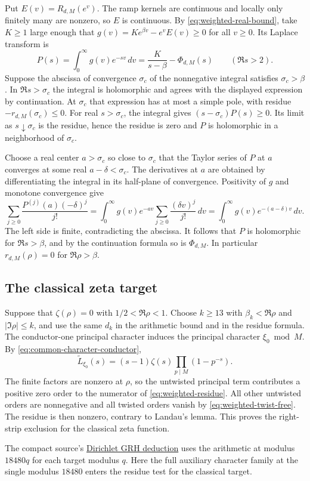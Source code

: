 Put \(E(v)=R_{d,M}(e^v)\). The ramp kernels are continuous and locally only
finitely many are nonzero, so \(E\) is continuous. By
\eqref{eq:weighted-real-bound}, take
\(K\ge1\) large enough that \(g(v)=K e^{\beta v}-e^v E(v)\ge0\) for
all \(v\ge0\). Its Laplace transform is
\[
 P(s)=\int_0^\infty g(v)e^{-sv}\,dv
     =\frac{K}{s-\beta}-\Phi_{d,M}(s) \qquad (\Re s>2).
\]
Suppose the abscissa of convergence \(\sigma_c\) of the nonnegative
integral satisfies \(\sigma_c>\beta\). In \(\Re s>\sigma_c\) the integral
is holomorphic and agrees with the displayed expression by continuation.
At \(\sigma_c\) that expression has at most a simple pole, with residue
\(-r_{d,M}(\sigma_c)\le0\). For real \(s>\sigma_c\), the integral gives
\((s-\sigma_c)P(s)\ge0\). Its limit as \(s\downarrow\sigma_c\) is the
residue, hence the residue is zero and \(P\) is holomorphic in a
neighborhood of \(\sigma_c\).

Choose a real center \(a>\sigma_c\) so close to \(\sigma_c\) that the
Taylor series of \(P\) at \(a\) converges at some real \(a-\delta<\sigma_c\).
The derivatives at \(a\) are obtained by differentiating the integral in
its half-plane of convergence. Positivity of \(g\) and monotone
convergence give
\[
 \sum_{j\ge0}\frac{P^{(j)}(a)(-\delta)^j}{j!}
 =\int_0^\infty g(v)e^{-av}\sum_{j\ge0}\frac{(\delta v)^j}{j!}\,dv
 =\int_0^\infty g(v)e^{-(a-\delta)v}\,dv.
\]
The left side is finite, contradicting the abscissa. It follows that
\(P\) is holomorphic for \(\Re s>\beta\), and by the continuation formula
so is \(\Phi_{d,M}\). In particular \(r_{d,M}(\rho)=0\) for
\(\Re\rho>\beta\).

\subsection*{The classical zeta target}

%
Suppose that \(\zeta(\rho)=0\) with \(1/2<\Re\rho<1\). Choose
\(k\ge13\) with \(\beta_k<\Re\rho\) and \(|\Im\rho|\le k\), and use the
same \(d_k\) in the arithmetic bound and in the residue formula. The
conductor-one principal character induces the principal character
\(\xi_0\bmod M\). By \eqref{eq:common-character-conductor},
\[
 \widetilde L_{\xi_0}(s)=(s-1)\zeta(s)\prod_{p\mid M}(1-p^{-s}).
\]
The finite factors are nonzero at \(\rho\), so the
untwisted principal term contributes a positive zero order to
the numerator of \eqref{eq:weighted-residue}. All other untwisted orders
are nonnegative and all twisted orders vanish by
\eqref{eq:weighted-twist-free}. The residue is then nonzero, contrary to
Landau's lemma. This proves the right-strip exclusion for the classical
zeta function.

The compact source's
\href{https://github.com/lsernau/grh-lean/blob/72fead102f663d5c7a407964a13dc0cf9d977207/grh-compact/src/New/Main.lean\#L169-L197}{Dirichlet GRH deduction}
uses the arithmetic at modulus \(18480q\) for each target modulus \(q\).
Here the full auxiliary character family at the single modulus \(18480\)
enters the residue test for the classical target.


